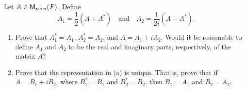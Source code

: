 \begin{ex}\label{ex:6.1.21}
	Let \(A \in \mathsf{M}_{{n} \times n}({\mathit{F}})\).
	Define
	\[
		A_1 = \frac{1}{2} (A + A^*) \quad \text{and} \quad A_2 = \frac{1}{2i} (A - A^*).
	\]
	\begin{enumerate}
		\item Prove that \(A_1^* = A_1\), \(A_2^* = A_2\), and \(A = A_1 + i A_2\).
		      Would it be reasonable to define \(A_1\) and \(A_2\) to be the real and imaginary parts, respectively, of the matrix \(A\)?
		\item Prove that the representation in (a) is unique.
		      That is, prove that if \(A = B_1 + i B_2\), where \(B_1^* = B_1\) and \(B_2^* = B_2\), then \(B_1 = A_1\) and \(B_2 = A_2\).
	\end{enumerate}
\end{ex}

